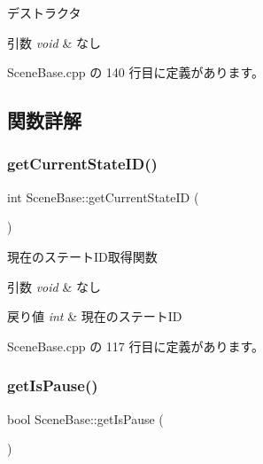 デストラクタ 


\begin{DoxyParams}{引数}
{\em void} & なし \\
\hline
\end{DoxyParams}


 Scene\+Base.\+cpp の 140 行目に定義があります。



\subsection{関数詳解}
\mbox{\label{class_scene_base_afb3f808f6a46816606a6b0692401e7ca}} 
\subsubsection{\texorpdfstring{get\+Current\+State\+I\+D()}{getCurrentStateID()}}
{\footnotesize\ttfamily int Scene\+Base\+::get\+Current\+State\+ID (\begin{DoxyParamCaption}{ }\end{DoxyParamCaption})}



現在のステート\+I\+D取得関数 


\begin{DoxyParams}{引数}
{\em void} & なし \\
\hline
\end{DoxyParams}

\begin{DoxyRetVals}{戻り値}
{\em int} & 現在のステート\+ID \\
\hline
\end{DoxyRetVals}


 Scene\+Base.\+cpp の 117 行目に定義があります。

\mbox{\label{class_scene_base_a2c3a13167da6971cb6c61b439b214654}} 
\subsubsection{\texorpdfstring{get\+Is\+Pause()}{getIsPause()}}
{\footnotesize\ttfamily bool Scene\+Base\+::get\+Is\+Pause (\begin{DoxyParamCaption}{ }\end{DoxyParamCaption})}



